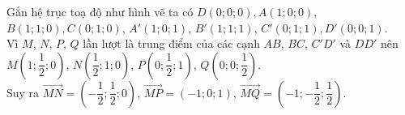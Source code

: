 \begin{bt}
{\begin{center}
		\end{center}
		Gắn hệ trục toạ độ như hình vẽ ta có $D\left(0;0;0\right),A\left(1;0;0\right)$, $B\left(1;1;0\right),C\left(0;1;0\right)$, $A'\left(1;0;1\right)$,  $B'\left(1;1;1\right)$, $C'\left(0;1;1\right),D'\left(0;0;1\right)$.\\
		Vì $M$, $N$, $P$, $Q$ lần  lượt là trung điểm của các cạnh $AB$, $BC$, $C'D'$ và $DD'$ nên $M\left(1;\dfrac{1}{2};0\right)$, $N\left(\dfrac{1}{2};1;0\right)$, $P\left(0;\dfrac{1}{2};1\right)$, $Q\left(0;0;\dfrac{1}{2} \right)$.\\
		Suy ra $\overrightarrow{MN}=\left(-\dfrac{1}{2};\dfrac{1}{2};0\right)$, $\overrightarrow{MP}=\left(-1;0;1\right)$, $\overrightarrow{MQ}=\left(-1;-\dfrac{1}{2};\dfrac{1}{2} \right)$. 
	} 
\end{bt}


